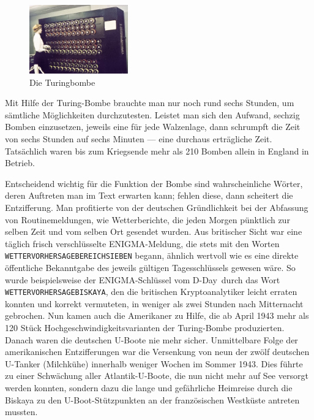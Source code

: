 \documentclass[%
11pt,%
twoside,%
titlepage,%
german,%
headsepline%
]{scrartcl}
\begin{document}
\begin{figure}
\vspace{0pt}
\begin{center}
\includegraphics[width=0.38\textwidth]{pictures/turingbombe.jpg}
\caption{Die Turingbombe}
\end{center}
\vspace{0pt}
\end{figure}
Mit Hilfe der Turing-Bombe brauchte man nur noch rund sechs Stunden, um sämtliche Mög\-lich\-kei\-ten durchzutesten. Leistet man sich den Aufwand, sechzig Bomben einzusetzen, jeweils eine für jede Walzenlage, dann schrumpft die Zeit von sechs Stunden auf sechs Minuten --- eine durchaus erträgliche Zeit. Tatsächlich waren bis zum Kriegsende mehr als 210 Bomben allein in England in Betrieb.

Entscheidend wichtig für die Funktion der Bombe sind \grqq wahrscheinliche Wörter\grqq, deren Auftreten man im Text erwarten kann; fehlen diese, dann scheitert die Entzifferung.
Man profitierte von der deutschen Gründlichkeit bei der Abfassung von Routinemeldungen, wie Wetterberichte, die jeden Morgen pünktlich zur selben Zeit und vom selben Ort gesendet wurden. Aus britischer Sicht war eine täglich frisch verschlüsselte ENIGMA-Meldung, die stets mit den Worten \texttt{WETTERVORHERSAGEBEREICHSIEBEN} begann, ähnlich wertvoll wie es eine direkte öffentliche Bekanntgabe des jeweils gültigen Tagesschlüssels gewesen wäre. So wurde beispielsweise der ENIGMA-Schlüssel vom \glqq D-Day\grqq\ durch das Wort \texttt{WETTERVORHERSAGEBISKAYA}, den die britischen Kryptoanalytiker leicht erraten konnten und korrekt vermuteten, in weniger als zwei Stunden nach Mitternacht gebrochen.
Nun kamen auch die Amerikaner zu Hilfe, die ab April 1943 mehr als 120 Stück Hochgeschwindigkeitsvarianten der Turing-Bombe produzierten. Danach waren die deutschen U-Boote nie mehr sicher. Unmittelbare Folge der amerikanischen Entzifferungen war die Versenkung von neun der zwölf deutschen U-Tanker (\glqq Milchkühe\grqq) innerhalb weniger Wochen im Sommer 1943. Dies führte zu einer Schwächung aller Atlantik-U-Boote, die nun nicht mehr auf See versorgt werden konnten, sondern dazu die lange und gefährliche Heimreise durch die Biskaya zu den U-Boot-Stützpunkten an der französischen Westküste antreten mussten.
\end{document}
